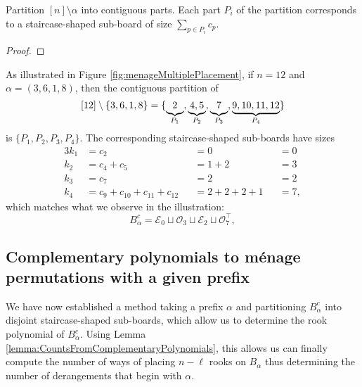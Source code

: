 
\begin{lemma}
  Partition $[n] \setminus \alpha$ into contiguous parts. Each part $P_i$
  of the partition corresponds to a staircase-shaped sub-board of size
  $\sum_{p \in P_i} c_p$.
\end{lemma}

\begin{proof}
\end{proof}

\begin{example}
  As illustrated in Figure \ref{fig:menageMultiplePlacement}, if $n = 12$
  and $\alpha = (3,6,1,8)$, then the contiguous partition of \[
    [12] \setminus \{3,6,1,8\} = \{
      \underbrace{2\vphantom{,}}_{P_1},
      \underbrace{4, 5}_{P_2},
      \underbrace{7\vphantom{,}}_{P_3},
      \underbrace{9, 10, 11, 12}_{P_4}
    \}
  \] is $\{P_1, P_2, P_3, P_4\}$. The corresponding staircase-shaped sub-boards
  have sizes
  \begin{alignat*}{3}
    k_1 &= c_2                            &&= 0             &&= 0 \\
    k_2 &= c_4 + c_5                      &&= 1 + 2         &&= 3 \\
    k_3 &= c_7                            &&= 2             &&= 2 \\
    k_4 &= c_9 + c_{10} + c_{11} + c_{12} &&= 2 + 2 + 2 + 1 &&= 7,
  \end{alignat*}
  which matches what we observe in the illustration:
  \[
    B_\alpha^c = \mathcal{E}_0 \sqcup \mathcal{O}_3 \sqcup \mathcal{E}_2 \sqcup \mathcal{O}_7^\intercal,
  \]
  \label{ex:blocksFromPrefix}
\end{example}

\subsection{Complementary polynomials to m\'enage permutations with a given prefix}
We have now established a method taking a prefix $\alpha$
and partitioning $B_\alpha^c$ into disjoint staircase-shaped sub-boards,
which allow us to determine the rook polynomial of $B_\alpha^c$.
Using Lemma \ref{lemma:CountsFromComplementaryPolynomials}, this allows us
can finally compute the number of ways of placing $n - \ell$ rooks on
$B_\alpha$ thus determining the number of derangements that begin with
$\alpha$.

